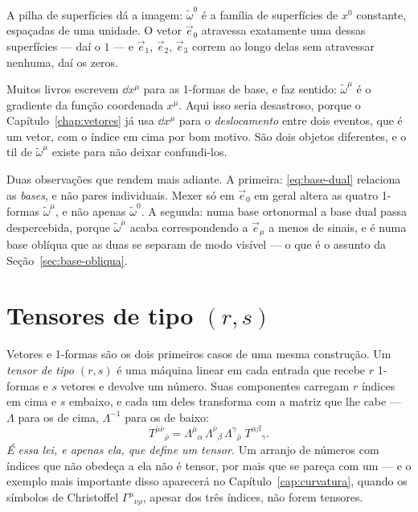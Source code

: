 \documentclass[12pt,a4paper,oneside]{book}
\theoremstyle{rgplain}
\theoremstyle{rgremark}
\begin{document}
A pilha de superfícies dá a imagem: $\tilde\omega^0$ é a família de superfícies
de $x^0$ constante, espaçadas de uma unidade. O vetor $\vec e_0$ atravessa
exatamente uma dessas superfícies --- daí o $1$ --- e $\vec e_1$, $\vec e_2$,
$\vec e_3$ correm ao longo delas sem atravessar nenhuma, daí os zeros.

\begin{atencao}[title={\sffamily\bfseries\footnotesize\color{rgTerracota}UMA COLISÃO DE NOTAÇÃO}]
Muitos livros escrevem $\dd x^\mu$ para as 1-formas de base, e faz sentido:
$\tilde\omega^\mu$ é o gradiente da função coordenada $x^\mu$. Aqui isso seria
desastroso, porque o Capítulo~\ref{chap:vetores} já usa $\dd x^\mu$ para o
\emph{deslocamento} entre dois eventos, que é um vetor, com o índice em cima
por bom motivo. São dois objetos diferentes, e o til de $\tilde\omega^\mu$
existe para não deixar confundi-los.
\end{atencao}

Duas observações que rendem mais adiante. A primeira: \eqref{eq:base-dual}
relaciona as \emph{bases}, e não pares individuais. Mexer só em $\vec e_0$ em
geral altera as quatro 1-formas $\tilde\omega^\mu$, e não apenas
$\tilde\omega^0$. A segunda: numa base ortonormal a base dual passa
despercebida, porque $\tilde\omega^\mu$ acaba correspondendo a $\vec e_\mu$ a
menos de sinais, e é numa base oblíqua que as duas se separam de modo visível
--- o que é o assunto da Seção~\ref{sec:base-obliqua}.

\section{Tensores de tipo $(r,s)$}
\label{sec:tipos-tensor}

Vetores e 1-formas são os dois primeiros casos de uma mesma construção. Um
\emph{tensor de tipo $(r,s)$} é uma máquina linear em cada entrada que recebe
$r$ 1-formas e $s$ vetores e devolve um número. Suas componentes carregam $r$
índices em cima e $s$ embaixo, e cada um deles transforma com a matriz que lhe
cabe --- $\Lambda$ para os de cima, $\Lambda^{-1}$ para os de baixo:
\[
  T^{\bar\mu\bar\nu}{}_{\bar\rho}
  =\Lambda^{\bar\mu}{}_{\alpha}\,\Lambda^{\bar\nu}{}_{\beta}\,
   \Lambda^{\gamma}{}_{\bar\rho}\;T^{\alpha\beta}{}_{\gamma}.
\]
\emph{É essa lei, e apenas ela, que define um tensor.} Um arranjo de números
com índices que não obedeça a ela não é tensor, por mais que se pareça com um
--- e o exemplo mais importante disso aparecerá no
Capítulo~\ref{cap:curvatura}, quando os símbolos de Christoffel
$\Gamma^\mu{}_{\nu\rho}$, apesar dos três índices, não forem tensores.
\end{document}
